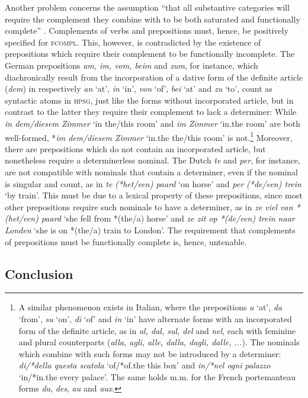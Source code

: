 \documentclass[output=paper
                ,modfonts
                ,nonflat
	        ,collection
	        ,collectionchapter
	        ,collectiontoclongg
 	        ,biblatex
                ,babelshorthands
                ,newtxmath
                ,draftmode
                ,colorlinks, citecolor=brown
]{./langsci/langscibook}
\begin{document}
Another problem concerns the assumption ``that all substantive categories will 
require the complement they combine with to be both saturated and 
functionally complete'' \citep[311]{Netter94}. Complements of verbs and 
prepositions must, hence, be positively specified for \textsc{fcompl}. 
This, however, is contradicted by the existence of 
prepositions which require their complement to be functionally incomplete. 
The German prepositions \emph{am, im, vom, beim} and \emph{zum}, for instance, 
which diachronically result from the incorporation of a dative form of the 
definite article (\emph{dem}) in respectively \emph{an} `at', 
\emph{in} `in', \emph{von} `of', \emph{bei} `at' and \emph{zu} `to',
count as syntactic atoms in \textsc{hpsg}, just like 
the forms without incorporated article, but in contrast to the 
latter they require their complement to lack a determiner: While  
\emph{in dem/diesem Zimmer} `in the/this room' and \emph{im Zimmer} `in.the room'
are both well-formed, *\emph{im dem/diesem Zimmer} `in.the the/this room' is 
not.\footnote{A similar phenomenon exists in Italian, where the prepositions 
\emph{a} `at', \emph{da} `from', \emph{su} `on', \emph{di} `of' and \emph{in} `in' 
have alternate forms with an incorporated form of the definite article, as in  
\emph{al, dal, sul, del} and \emph{nel}, each with 
feminine and plural counterparts (\emph{alla, agli, alle, dalla, dagli, dalle, ...}). 
The nominals which combine with such forms may not be introduced by a determiner:
\emph{di/*della questa scatola} `of/*of.the this box' and \emph{in/*nel ogni palazzo} 
`in/*in.the every palace'. The same holds m.m. for the French 
portemanteau forms \emph{du}, \emph{des}, \emph{au} and \emph{aux}.}   
Moreover, there are prepositions which do not contain an 
incorporated article, but nonetheless require a determinerless nominal. 
The Dutch \emph{te} and \emph{per}, for instance, are not compatible with nominals 
that contain a determiner, even if the nominal is singular and count, 
as in \emph{te (*het/een) paard} `on horse' and \emph{per (*de/een) trein} `by train'.   
This must be due to a lexical property of these prepositions, 
since most other prepositions require such nominals to have 
a determiner, as in \emph{ze viel van *(het/een) paard} `she fell from *(the/a) horse' 
and \emph{ze zit op *(de/een) trein naar Londen} `she is on *(the/a) train to London'.  
The requirement that complements of prepositions must be functionally complete is,
hence, untenable.  


\subsection{Conclusion} 
\end{document}
